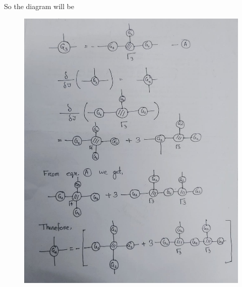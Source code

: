\documentclass[12pt, letterpaper]{article}
\newcommand*{\1}{\hspace{1pt}}
\begin{document}
    So the diagram will be 
    \begin{figure}[h]
    \centering
    \includegraphics[scale=.3]{spic}
    \end{figure}
\end{document}
